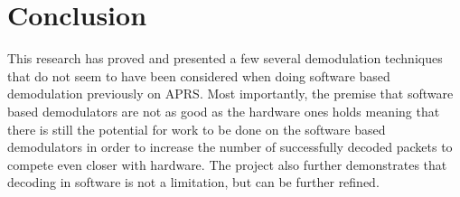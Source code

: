 \chapter{Conclusion}

This research has proved and presented a few several demodulation techniques that do not seem to have been considered when doing software based demodulation previously on APRS. Most importantly, the premise that software based demodulators are not as good as the hardware ones holds meaning that there is still the potential for work to be done on the software based demodulators in order to increase the number of successfully decoded packets to compete even closer with hardware. The project also further demonstrates that decoding in software is not a limitation, but can be further refined.
